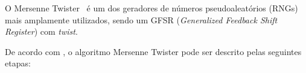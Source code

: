 O Mersenne Twister~\parencite{matsumoto1998mersenne} é um dos geradores de
números pseudoaleatórios (RNGs) mais amplamente utilizados, sendo um GFSR
(\textit{Generalized Feedback Shift Register}) com \textit{twist}.
%
%

De acordo com \textcite{tan2016}, o algoritmo Mersenne Twister pode ser
descrito pelas seguintes etapas:


